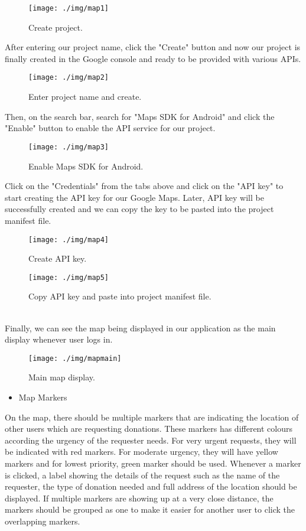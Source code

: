 \documentclass[conference]{IEEEtran}
\begin{document}
\begin{figure}[h!]
\texttt{[image: ./img/map1]}
\centering
\caption{Create project.}
\end{figure}
After entering our project name, click the "Create" button and now our project is finally created in the Google console and ready to be provided with various APIs.\\
\begin{figure}[h!]
\texttt{[image: ./img/map2]}
\centering
\caption{Enter project name and create.}
\end{figure}
Then, on the search bar, search for "Maps SDK for Android" and click the "Enable" button to enable the API service for our project.
\begin{figure}[h!]
\texttt{[image: ./img/map3]}
\centering
\caption{Enable Maps SDK for Android.}
\end{figure}
Click on the "Credentials" from the tabs above and click on the "API key" to start creating the API key for our Google Maps. Later, API key will be successfully created and we can copy the key to be pasted into the project manifest file.
\begin{figure}[h!]
\texttt{[image: ./img/map4]}
\centering
\caption{Create API key.}
\end{figure}
\begin{figure}[h!]
\texttt{[image: ./img/map5]}
\centering
\caption{Copy API key and paste into project manifest file.}
\end{figure}
\\Finally, we can see the map being displayed in our application as the main display whenever user logs in.

\begin{figure}[h!]
\texttt{[image: ./img/mapmain]}
\centering
\caption{Main map display.}
\end{figure}
\begin{itemize}
\item Map Markers
\end{itemize}
\par On the map, there should be multiple markers that are indicating the location of other users which are requesting donations. These markers has different colours according the urgency of the requester needs. For very urgent requests, they will be indicated with red markers. For moderate urgency, they will have yellow markers and for lowest priority, green marker should be used. Whenever a marker is clicked, a label showing the details of the request such as the name of the requester, the type of donation needed and full address of the location should be displayed. If multiple markers are showing up at a very close distance, the markers should be grouped as one to make it easier for another user to click the overlapping markers. 
\end{document}
